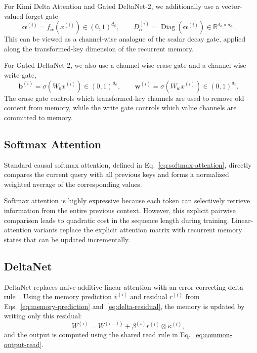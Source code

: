 \documentclass{article}
\DeclareMathOperator{\Diag}{Diag}
\begin{document}
For Kimi Delta Attention and Gated DeltaNet-2, we additionally use a vector-valued forget gate
\begin{equation}
\label{eq:channel-forget-gate}
\bm{\alpha}^{(i)}
=
f_{\bm{\alpha}}\!\left(x^{(i)}\right)
\in (0,1)^{d_\phi},
\qquad
D_{\alpha}^{(i)}
=
\Diag\!\left(\bm{\alpha}^{(i)}\right)
\in
\mathbb{R}^{d_\phi \times d_\phi}.
\end{equation}
This can be viewed as a channel-wise analogue of the scalar decay gate, applied along the transformed-key dimension of the recurrent memory.

For Gated DeltaNet-2, we also use a channel-wise erase gate and a channel-wise write gate,
\begin{equation}
\label{eq:gdn2-erase-write-gates}
\bm b^{(i)}
=
\sigma\!\left(W_b x^{(i)}\right)
\in (0,1)^{d_\phi},
\qquad
\bm w^{(i)}
=
\sigma\!\left(W_w x^{(i)}\right)
\in (0,1)^{d_v}.
\end{equation}
The erase gate controls which transformed-key channels are used to remove old content from memory, while the write gate controls which value channels are committed to memory.

\subsection{Softmax Attention}

Standard causal softmax attention, defined in Eq.~\eqref{eq:softmax-attention}, directly compares the current query with all previous keys and forms a normalized weighted average of the corresponding values.

Softmax attention is highly expressive because each token can selectively retrieve information from the entire previous context. However, this explicit pairwise comparison leads to quadratic cost in the sequence length during training. Linear-attention variants replace the explicit attention matrix with recurrent memory states that can be updated incrementally.

\subsection{DeltaNet}

DeltaNet replaces naive additive linear attention with an error-correcting delta rule~\cite{schlag2021linear}. Using the memory prediction $\bar v^{(i)}$ and residual $r^{(i)}$ from Eqs.~\eqref{eq:memory-prediction} and~\eqref{eq:delta-residual}, the memory is updated by writing only this residual:
\begin{equation}
W^{(i)}
=
W^{(i-1)}
+
\beta^{(i)}
r^{(i)}
\otimes
\kappa^{(i)},
\end{equation}
and the output is computed using the shared read rule in Eq.~\eqref{eq:common-output-read}.
\end{document}
